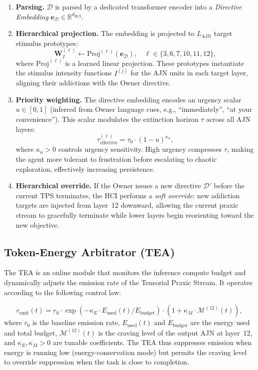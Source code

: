 \documentclass[12pt,a4paper]{article}
\begin{document}
\begin{enumerate}
  \item \textbf{Parsing.} $\mathcal{D}$ is parsed by a dedicated transformer
    encoder into a \textit{Directive Embedding} $\mathbf{e}_\mathcal{D}
    \in \mathbb{R}^{d_{\text{HCI}}}$.
  \item \textbf{Hierarchical projection.} The embedding is projected to
    $L_{\text{AJN}}$ target stimulus prototypes:
    \[
      \mathbf{W}_{I}^{(\ell)} \leftarrow \text{Proj}^{(\ell)}(\mathbf{e}_\mathcal{D}),
      \quad \ell \in \{3,6,7,10,11,12\},
    \]
    where $\text{Proj}^{(\ell)}$ is a learned linear projection. These
    prototypes instantiate the stimulus intensity functions $I^{(j)}$ for the
    AJN units in each target layer, aligning their addictions with the Owner
    directive.
  \item \textbf{Priority weighting.} The directive embedding encodes an
    urgency scalar $u \in [0,1]$ (inferred from Owner language cues, e.g.,
    ``immediately'', ``at your convenience''). This scalar modulates the
    extinction horizon $\tau$ across all AJN layers:
    \[
      \tau^{(\ell)}_{\text{effective}} = \tau_0 \cdot (1 - u)^{\kappa_u},
    \]
    where $\kappa_u>0$ controls urgency sensitivity. High urgency compresses
    $\tau$, making the agent more tolerant to frustration before escalating to
    chaotic exploration, effectively increasing persistence.
  \item \textbf{Hierarchical override.} If the Owner issues a new directive
    $\mathcal{D}'$ before the current TPS terminates, the HCI performs a
    \textit{soft override}: new addiction targets are injected from layer~12
    downward, allowing the current praxic stream to gracefully terminate while
    lower layers begin reorienting toward the new objective.
\end{enumerate}

\subsection{Token-Energy Arbitrator (TEA)}

The TEA is an online module that monitors the inference compute budget and
dynamically adjusts the emission rate of the Tensorial Praxic Stream. It
operates according to the following control law:

\begin{equation}
  r_{\text{emit}}(t) = r_0 \cdot \exp\!\left(-\kappa_E \cdot E_{\text{used}}(t) /
    E_{\text{budget}}\right) \cdot (1 + \kappa_M \cdot \mathcal{M}^{(12)}(t)),
  \label{eq:tea}
\end{equation}
where $r_0$ is the baseline emission rate, $E_{\text{used}}(t)$ and
$E_{\text{budget}}$ are the energy used and total budget, $\mathcal{M}^{(12)}(t)$
is the craving level of the output AJN at layer~12, and $\kappa_E, \kappa_M>0$
are tunable coefficients. The TEA thus suppresses emission when energy is
running low (energy-conservation mode) but permits the craving level to override
suppression when the task is close to completion.
\end{document}

